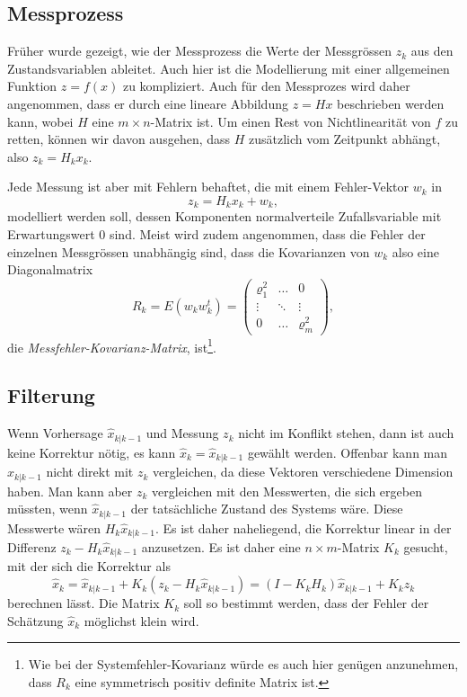 \subsection{Messprozess\label{subsection:messprozess}}
Früher wurde gezeigt, wie der Messprozess die Werte der Messgrössen $z_k$
aus den Zustandsvariablen ableitet.
Auch hier ist die Modellierung mit einer allgemeinen Funktion $z=f(x)$ 
zu kompliziert.
Auch für den Messprozes wird daher angenommen, dass er durch eine
lineare Abbildung $z=Hx$ beschrieben werden kann, wobei $H$ eine
$m\times n$-Matrix ist.
Um einen Rest von Nichtlinearität von $f$ zu retten, können wir davon
ausgehen, dass $H$ zusätzlich vom Zeitpunkt abhängt, also $z_k=H_kx_k$.

Jede Messung ist aber mit Fehlern behaftet, die mit einem Fehler-Vektor
$w_k$ in
\begin{equation}
z_k = H_kx_k + w_k,
\label{skript:kalman:messfehler}
\end{equation}
modelliert werden soll,
dessen Komponenten normalverteile Zufallsvariable mit Erwartungswert $0$
sind.
Meist wird zudem angenommen, dass die Fehler der einzelnen Messgrössen
unabhängig sind, dass die Kovarianzen von $w_k$ also eine
Diagonalmatrix
\[
R_k = E(w_kw_k^t) =
\begin{pmatrix}
\varrho_1^2&\dots & 0\\
\vdots     &\ddots&\vdots\\
0          &\dots &\varrho_m^2
\end{pmatrix},
\]
die {\em Messfehler-Kovarianz-Matrix},
ist\footnote{Wie bei der Systemfehler-Kovarianz würde es auch hier
genügen anzunehmen, dass $R_k$ eine symmetrisch positiv definite Matrix
ist.}.
%
%

\subsection{Filterung\label{subsection:filterung}}
Wenn Vorhersage $\hat{x}_{k|k-1}$ und Messung $z_k$ nicht im Konflikt
stehen, dann ist auch keine Korrektur nötig, es kann
$\hat{x}_k = \hat{x}_{k|k-1}$ gewählt werden.
Offenbar kann man $\hat{x}_{k|k-1}$ nicht direkt mit $z_k$ vergleichen,
da diese Vektoren verschiedene Dimension haben.
Man kann aber $z_k$ vergleichen mit den Messwerten, die sich ergeben
müssten, wenn $\hat{x}_{k|k-1}$ der tatsächliche Zustand des Systems
wäre.
Diese Messwerte wären $H_k\hat{x}_{k|k-1}$.
Es ist daher naheliegend,
die Korrektur linear in der Differenz $z_k-H_k\hat{x}_{k|k-1}$
anzusetzen.
Es ist daher eine $n\times m$-Matrix $K_k$ gesucht, mit der sich
die Korrektur als
\begin{equation}
\hat{x}_{k}
=
\hat{x}_{k|k-1} + K_k(z_k-H_k\hat{x}_{k|k-1})
=
(I-K_kH_k)\hat{x}_{k|k-1} + K_kz_k
\label{skript:kalman:filter}
\end{equation}
berechnen lässt.
Die Matrix $K_k$ soll so bestimmt werden, dass der Fehler der
Schätzung $\hat{x}_k$ möglichst klein wird.

